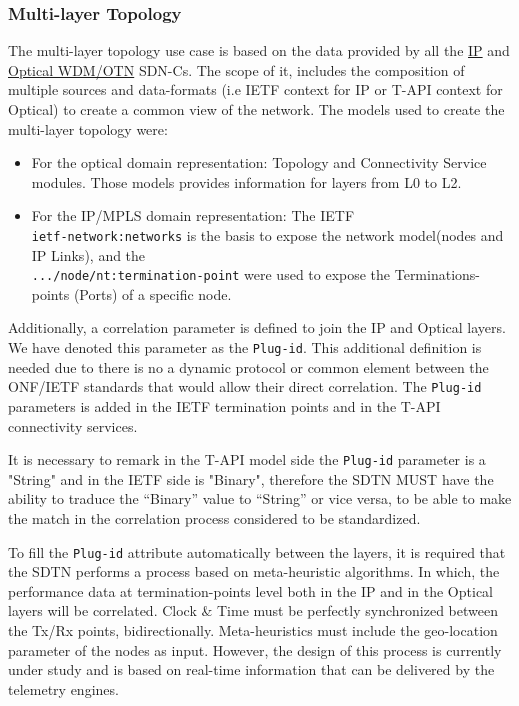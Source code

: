 \documentclass[a4paper,fleqn]{cas-dc}
\begin{document}

\subsubsection{Multi-layer Topology}

The multi-layer topology use case is based on the data provided by all the \hyperref[subsection:IPtopo]{IP} and \hyperref[subsection:OPTopo]{Optical WDM/OTN} SDN-Cs. The scope of it, includes the composition of multiple sources and data-formats (i.e IETF context for IP or T-API context for Optical) to create a common view of the network. The models used to create the multi-layer topology were:
\begin{itemize}
    \item For the optical domain representation: Topology and Connectivity Service modules. Those models provides information for layers from L0 to L2.
    \item For the IP/MPLS domain representation: The IETF\\ \texttt{ietf-network:networks} is the basis to expose the network model(nodes and IP Links), and the \\ \texttt{.../node/nt:termination-point}
    were used to expose the Terminations-points (Ports) of a specific node.
\end{itemize}
    
Additionally, a correlation parameter is defined to join the IP and Optical layers. We have denoted this parameter as the \texttt{Plug-id}. This additional definition is needed due to there is no a dynamic protocol or common element between the ONF/IETF standards that would allow their direct correlation. The \texttt{Plug-id} parameters is added in the IETF termination points and in the T-API connectivity services. 

It is necessary to remark in the T-API model side the \texttt{Plug-id} parameter is a "String" and in the IETF side is "Binary", therefore the SDTN MUST have the ability to traduce the “Binary” value to “String” or vice versa, to be able to make the match in the correlation process considered to be standardized.

To fill the \texttt{Plug-id} attribute automatically between the layers, it is required that the SDTN performs a process based on meta-heuristic algorithms. In which, the performance data at termination-points level both in the IP and in the Optical layers will be correlated. Clock \& Time must be perfectly synchronized between the Tx/Rx points, bidirectionally. Meta-heuristics must include the geo-location parameter of the nodes as input. However, the design of this process is currently under study and is based on real-time information that can be delivered by the telemetry engines.
\end{document}
